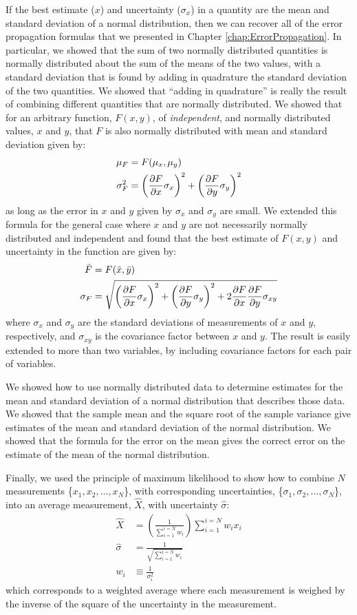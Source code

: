 If the best estimate ($x$) and uncertainty ($\sigma_x$) in a quantity are the mean and standard deviation of a normal distribution, then we can recover all of the error propagation formulas that we presented in Chapter \ref{chap:ErrorPropagation}. In particular, we showed that the sum of two normally distributed quantities is normally distributed about the sum of the means of the two values, with a standard deviation that is found by adding in quadrature the standard deviation of the two quantities. We showed that ``adding in quadrature'' is really the result of combining different quantities that are normally distributed. We showed that for an arbitrary function, $F(x,y)$, of \textit{independent}, and normally distributed values, $x$ and $y$, that $F$ is also normally distributed with mean and standard deviation given by:
\begin{align}
\mu_F &=F(\mu_x,\mu_y)\nonumber\\
\sigma_F^2&=\left(\frac{\partial F}{\partial x}\sigma_x\right)^2+\left(\frac{\partial F}{\partial y}\sigma_y\right)^2
\end{align}
as long as the error in $x$ and $y$ given by $\sigma_x$ and $\sigma_y$ are small. We extended this formula for the general case where $x$ and $y$ are not necessarily normally distributed and independent and found that the best estimate of $F(x,y)$ and uncertainty in the function are given by:
\begin{align}
\bar F&=F(\bar x, \bar y)\nonumber\\
\sigma_F&=\sqrt{\left(\frac{\partial F}{\partial x}\sigma_x\right)^2+\left(\frac{\partial F}{\partial y}\sigma_y\right)^2+2\frac{\partial F}{\partial x}\frac{\partial F}{\partial y}\sigma_{xy}}
\end{align} 
where $\sigma_x$ and $\sigma_y$ are the standard deviations of measurements of $x$ and $y$, respectively, and $\sigma_{xy}$ is the covariance factor between $x$ and $y$. The result is easily extended to more than two variables, by including covariance factors for each pair of variables.

We showed how to use normally distributed data to determine estimates for the mean and standard deviation of a normal distribution that describes those data. We showed that the sample mean and the square root of the sample variance give estimates of the mean and standard deviation of the normal distribution. We showed that the formula for the error on the mean gives the correct error on the estimate of the mean of the normal distribution.

Finally, we used the principle of maximum likelihood to show how to combine $N$ measurements \{$x_1, x_2, \dots, x_N$\}, with corresponding uncertainties, \{$\sigma_1, \sigma_2, \dots, \sigma_N  $\}, into an average measurement, $\hat X$, with uncertainty $\hat \sigma$:
\begin{align}
\hat X &= \left(\frac{1}{\sum_{i=1}^{i=N} w_i}\right)\sum_{i=1}^{i=N} w_i x_i\nonumber\\
\hat \sigma&=\frac{1}{\sqrt{\sum_{i=1}^{i=N}w_i}}\nonumber\\
w_i &\equiv \frac{1}{\sigma_i^2}
\end{align}
which corresponds to a weighted average where each measurement is weighed by the inverse of the square of the uncertainty in the measurement.
